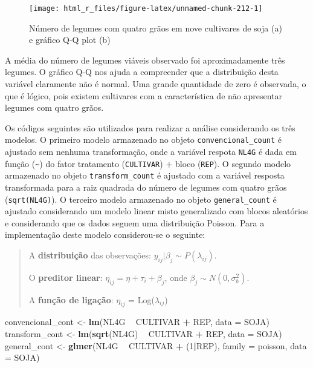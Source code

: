 \documentclass[
]{book}
\newenvironment{Shaded}{\begin{snugshade}}{\end{snugshade}}
\newcommand{\DataTypeTok}[1]{\textcolor[rgb]{0.13,0.29,0.53}{#1}}
\newcommand{\DecValTok}[1]{\textcolor[rgb]{0.00,0.00,0.81}{#1}}
\newcommand{\KeywordTok}[1]{\textcolor[rgb]{0.13,0.29,0.53}{\textbf{#1}}}
\newcommand{\NormalTok}[1]{#1}
\newcommand{\OperatorTok}[1]{\textcolor[rgb]{0.81,0.36,0.00}{\textbf{#1}}}
\newcommand{\StringTok}[1]{\textcolor[rgb]{0.31,0.60,0.02}{#1}}
\begin{document}
\begin{figure}

{\centering \texttt{[image: html\_r\_files/figure-latex/unnamed-chunk-212-1]} 

}

\caption{Número de legumes com quatro grãos em nove cultivares de soja (a) e gráfico Q-Q plot (b)}\label{fig:unnamed-chunk-212}
\end{figure}

A média do número de legumes viáveis observado foi aproximadamente três legumes. O gráfico Q-Q nos ajuda a compreender que a distribuição desta variável claramente não é normal. Uma grande quantidade de zero é observada, o que é lógico, pois existem cultivares com a característica de não apresentar legumes com quatro grãos.

Os códigos seguintes são utilizados para realizar a análise considerando os três modelos. O primeiro modelo armazenado no objeto \texttt{convencional\_count} é ajustado sem nenhuma transformação, onde a variável respota \texttt{NL4G} é dada em função (\texttt{\textasciitilde{}}) do fator tratamento (\texttt{CULTIVAR}) \(+\) bloco (\texttt{REP}). O segundo modelo armazenado no objeto \texttt{transform\_count} é ajustado com a variável resposta transformada para a raiz quadrada do número de legumes com quatro grãos (\texttt{sqrt(NL4G)}). O terceiro modelo armazenado no objeto \texttt{general\_count} é ajustado considerando um modelo linear misto generalizado com blocos aleatórios e considerando que os dados seguem uma distribuição Poisson. Para a implementação deste modelo considerou-se o seguinte:

\begin{quote}
A \textbf{distribuição} das observações: \(y_{ij}|\beta_j \sim P(\lambda_{ij})\).

O \textbf{preditor linear}: \(\eta_{ij} = \eta + \tau_{i} + \beta_j\), onde \(\beta_j \sim N(0, \sigma^2_b)\).

A \textbf{função de ligação}: \(\eta_{ij}\) = Log(\(\lambda_{ij}\))
\end{quote}

 

\begin{Shaded}
\begin{Highlighting}[]
\NormalTok{convencional_cont <-}\StringTok{ }\KeywordTok{lm}\NormalTok{(NL4G }\OperatorTok{~}\StringTok{ }\NormalTok{CULTIVAR }\OperatorTok{+}\StringTok{ }\NormalTok{REP, }\DataTypeTok{data =}\NormalTok{ SOJA)}
\NormalTok{transform_cont <-}\StringTok{ }\KeywordTok{lm}\NormalTok{(}\KeywordTok{sqrt}\NormalTok{(NL4G) }\OperatorTok{~}\StringTok{ }\NormalTok{CULTIVAR }\OperatorTok{+}\StringTok{ }\NormalTok{REP, }\DataTypeTok{data =}\NormalTok{ SOJA)}
\NormalTok{general_cont <-}\StringTok{ }\KeywordTok{glmer}\NormalTok{(NL4G }\OperatorTok{~}\StringTok{ }\NormalTok{CULTIVAR }\OperatorTok{+}\StringTok{ }\NormalTok{(}\DecValTok{1}\OperatorTok{|}\NormalTok{REP),}
                     \DataTypeTok{family =}\NormalTok{ poisson,}
                     \DataTypeTok{data =}\NormalTok{ SOJA)}
\end{Highlighting}
\end{Shaded}
\end{document}
